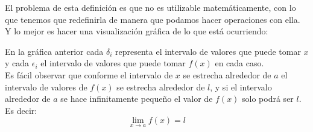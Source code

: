 \documentclass[a4paper,11pt,answers]{exam}
\begin{document}
El problema de esta definición es que no es utilizable matemáticamente, con lo que tenemos que redefinirla de manera que podamos hacer operaciones con ella. Y lo mejor es hacer una visualización gráfica de lo que está ocurriendo:
\begin{center}
\end{center}
En la gráfica anterior cada $\delta_i$ representa el intervalo de valores que puede tomar $x$ y cada $\epsilon_i$ el intervalo de valores que puede tomar $f(x)$ en cada caso.\\
Es fácil observar que conforme el intervalo de $x$ se estrecha alrededor de $a$ el intervalo de valores de $f(x)$ se estrecha alrededor de $l$, y si el intervalo alrededor de $a$ se hace infinitamente pequeño el valor de $f(x)$ solo podrá ser $l$. Es decir:
\[\lim_{x \to a} f(x) = l\]
\end{document}
